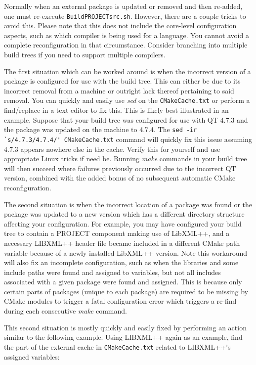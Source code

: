 \documentclass[12pt,letterpaper]{article}
\begin{document}
Normally when an external package is updated or removed and then re-added, one must re-execute \verb|BuildPROJECTsrc.sh|.  However, there are a couple tricks to avoid this.  Please note that this does not include the core-level configuration aspects, such as which compiler is being used for a language.  You cannot avoid a complete reconfiguration in that circumstance.  Consider branching into multiple build trees if you need to support multiple compilers.

The first situation which can be worked around is when the incorrect version of a package is configured for use with the build tree.  This can either be due to its incorrect removal from a machine or outright lack thereof pertaining to said removal.  You can quickly and easily use \emph{sed} on the \verb|CMakeCache.txt| or perform a find/replace in a text editor to fix this.  This is likely best illustrated in an example.  Suppose that your build tree was configured for use with QT 4.7.3 and the package was updated on the machine to 4.7.4.  The \verb|sed -ir `s/4.7.3/4.7.4/' CMakeCache.txt| command will quickly fix this issue assuming 4.7.3 appears nowhere else in the cache.  Verify this for yourself and use appropriate Linux tricks if need be.  Running \emph{make} commands in your build tree will then succeed where failures previously occurred due to the incorrect QT version, combined with the added bonus of no subsequent automatic CMake reconfiguration.

The second situation is when the incorrect location of a package was found or the package was updated to a new version which has a different directory structure affecting your configuration.  For example, you may have configured your build tree to contain a PROJECT component making use of LibXML++, and a necessary LIBXML++ header file became included in a different CMake path variable because of a newly installed LibXML++ version.  Note this workaround will also fix an incomplete configuration, such as when the libraries and some include paths were found and assigned to variables, but not all includes associated with a given package were found and assigned.  This is because only certain parts of packages (unique to each package) are required to be missing by CMake modules to trigger a fatal configuration error which triggers a re-find during each consecutive \emph{make} command.

This second situation is mostly quickly and easily fixed by performing an action similar to the following example.  Using LIBXML++ again as an example, find the part of the external cache in \verb|CMakeCache.txt| related to LIBXML++'s assigned variables:
\end{document}
